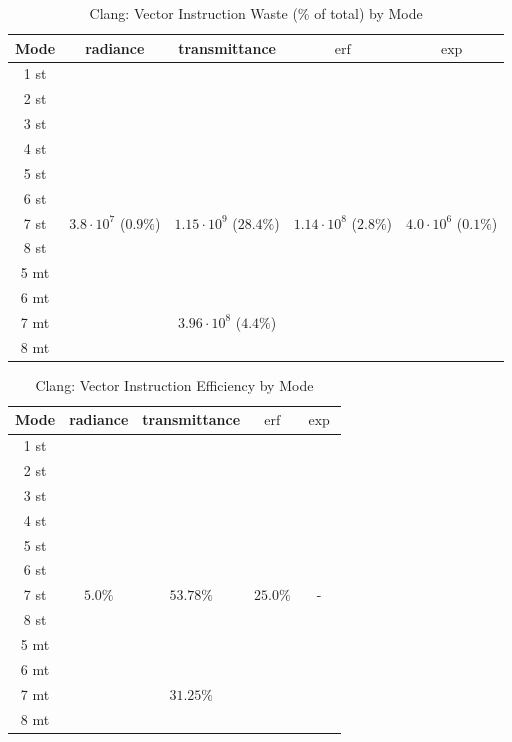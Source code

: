 \documentclass[a4paper, 11pt]{memoir}
\newcommand*{\erf}{\text{erf}}
\begin{document}
    \begin{table}[H]
        \centering
        \begin{tabular}{|c|c|c|c|c|}
            \hline
            Mode & \gls{radiance}             & \gls{transmittance}          & $\erf$                      & $\exp$\\\hline
            1 st & & & &\\
            2 st & & & &\\
            3 st & & & &\\
            4 st & & & &\\
            5 st & & & &\\
            6 st & & & &\\
            7 st & $3.8 \cdot 10^7$ ($0.9\%$) & $1.15 \cdot 10^9$ ($28.4\%$) & $1.14 \cdot 10^8$ ($2.8\%$) & $4.0 \cdot 10^6$ ($0.1\%$)\\
            8 st & & & &\\\hline\hline
            5 mt & & & &\\
            6 mt & & & &\\
            7 mt & & $3.96 \cdot 10^8$ ($4.4\%$) & &\\
            8 mt & & & &\\
            \hline
        \end{tabular}
        \caption{Clang: Vector Instruction Waste (\% of total) by Mode}
        \label{tab:clang_vec_waste}
    \end{table}
    \begin{table}[H]
        \centering
        \begin{tabular}{|c|c|c|c|c|}
            \hline
            Mode & \gls{radiance} & \gls{transmittance} & $\erf$   & $\exp$\\\hline
            1 st & & & &\\
            2 st & & & &\\
            3 st & & & &\\
            4 st & & & &\\
            5 st & & & &\\
            6 st & & & &\\
            7 st & $5.0\%$        & $53.78\%$           & $25.0\%$ & - \\
            8 st & & & &\\\hline\hline
            5 mt & & & &\\
            6 mt & & & &\\
            7 mt & & $31.25\%$ & &\\
            8 mt & & & &\\
            \hline
        \end{tabular}
        \caption{Clang: Vector Instruction Efficiency by Mode}
        \label{tab:clang_vec_efficiency}
    \end{table}
\end{document}
